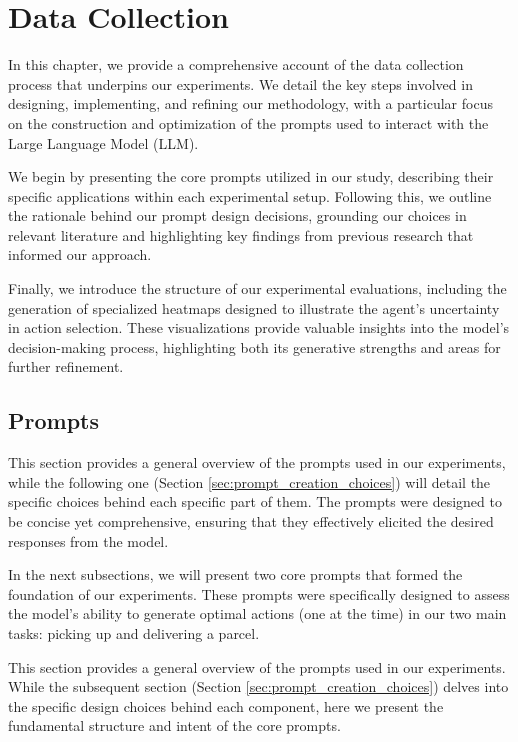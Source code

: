 \chapter{Data Collection}
\label{cha:data_collection}

In this chapter, we provide a comprehensive account of the data collection process
that underpins our experiments. We detail the key steps involved in designing, implementing,
and refining our methodology, with a particular focus on the construction and optimization
of the prompts used to interact with the Large Language Model (LLM).

We begin by presenting the core prompts utilized in our study, describing their
specific applications within each experimental setup. Following this, we outline
the rationale behind our prompt design decisions, grounding our choices in relevant
literature and highlighting key findings from previous research that informed our
approach.

Finally, we introduce the structure of our experimental evaluations, including the
generation of specialized heatmaps designed to illustrate the agent's uncertainty
in action selection. These visualizations provide valuable insights into the
model's decision-making process, highlighting both its generative strengths and areas
for further refinement.

\section{Prompts}
\label{sec:prompts}

This section provides a general overview of the prompts used in our experiments,
while the following one (Section \ref{sec:prompt_creation_choices}) will detail the
specific choices behind each specific part of them. The prompts were designed to
be concise yet comprehensive, ensuring that they effectively elicited the desired
responses from the model.

In the next subsections, we will present two core prompts that formed the
foundation of our experiments. These prompts were specifically designed to assess
the model's ability to generate optimal actions (one at the time) in our two main
tasks: picking up and delivering a parcel.

This section provides a general overview of the prompts used in our experiments.
While the subsequent section (Section \ref{sec:prompt_creation_choices}) delves into
the specific design choices behind each component, here we present the
fundamental structure and intent of the core prompts.

